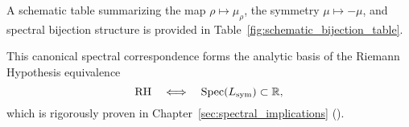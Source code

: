 A schematic table summarizing the map \( \rho \mapsto \mu_\rho \), the symmetry \( \mu \mapsto -\mu \), and spectral bijection structure is provided in Table~\ref{fig:schematic_bijection_table}.

\medskip

This canonical spectral correspondence forms the analytic basis of the Riemann Hypothesis equivalence
\[
\mathrm{RH} \quad \Longleftrightarrow \quad \operatorname{Spec}(L_{\mathrm{sym}}) \subset \mathbb{R},
\]
which is rigorously proven in Chapter~\ref{sec:spectral_implications} ().

